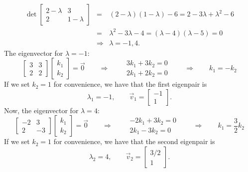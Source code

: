 \vspace{2mm}
\begin{eqnarray*}
  \det\left[\begin{array}{cc}2-\lambda&3\\2&1-\lambda\end{array}\right]&=&(2-\lambda)(1-\lambda)-6 = 2-3\lambda+\lambda^2-6\\
	&=& \lambda^2-3\lambda-4 = (\lambda-4)(\lambda-5)=0\\
	&\Rightarrow& \lambda = -1,4.
\end{eqnarray*}
The eigenvector for $\lambda=-1$:
$$
\left[\begin{array}{cc}3&3\\2&2\end{array}\right]\left[\begin{array}{c}k_1\\k_2\end{array}\right]=\vec{0}\qquad\Rightarrow\qquad
\begin{array}{c}3k_1+3k_2=0\\2k_1+2k_2=0\end{array}\qquad\Rightarrow\qquad k_1=-k_2
$$
If we set $k_2=1$ for convenience, we have that the first eigenpair is
$$
\lambda_1=-1,\qquad\vec{v}_1=\left[\begin{array}{c}-1\\1\end{array}\right].
$$
Now, the eigenvector for $\lambda=4$:
$$
\left[\begin{array}{cc}-2&3\\2&-3\end{array}\right]\left[\begin{array}{c}k_1\\k_2\end{array}\right]=\vec{0}\qquad\Rightarrow\qquad
\begin{array}{c}-2k_1+3k_2=0\\2k_1-3k_2=0\end{array}\qquad\Rightarrow\qquad k_1=\frac{3}{2} k_2
$$
If we set $k_2=1$ for convenience, we have that the second eigenpair is
$$
\lambda_2=4,\qquad\vec{v}_2=\left[\begin{array}{c}3/2\\1\end{array}\right].
$$
\vspace{2mm}
